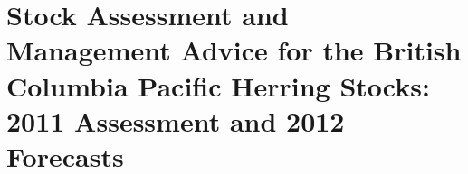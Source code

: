 

\part{Stock Assessment and Management Advice for the British Columbia Pacific Herring Stocks: 2011 Assessment and 2012 Forecasts}

\addtocounter{chapter}{1}





